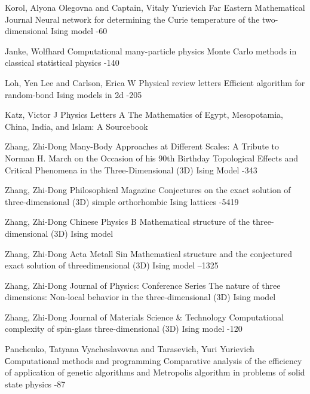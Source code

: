 \documentclass[10pt]{article}
\begin{document}
\begin{thebibliography}{20}
		\by Korol, Alyona Olegovna and Captain, Vitaly Yurievich
		\jour Far Eastern Mathematical Journal
		\paper Neural network for determining the Curie temperature of the two-dimensional Ising model
		-60
		
		\by Janke, Wolfhard
		\jour Computational many-particle physics
		\paper Monte Carlo methods in classical statistical physics
		-140
		
		\by Loh, Yen Lee and Carlson, Erica W
		\jour Physical review letters
		\paper Efficient algorithm for random-bond Ising models in 2d
		-205
		
		\by Katz, Victor J
		\jour Physics Letters A
		\paper The Mathematics of Egypt, Mesopotamia, China, India, and Islam: A Sourcebook
		
		\by Zhang, Zhi-Dong
		\jour Many-Body Approaches at Different Scales: A Tribute to Norman H. March on the Occasion of his 90th Birthday
		\paper Topological Effects and Critical Phenomena in the Three-Dimensional (3D) Ising Model
		-343
		
		\by Zhang, Zhi-Dong
		\jour Philosophical Magazine
		\paper Conjectures on the exact solution of three-dimensional (3D) simple orthorhombic Ising lattices
		-5419
		
		\by Zhang, Zhi-Dong
		\jour Chinese Physics B
		\paper Mathematical structure of the three-dimensional (3D) Ising model
		
		\by Zhang, Zhi-Dong
		\jour Acta Metall Sin
		\paper Mathematical structure and the conjectured exact solution of threedimensional (3D) Ising model
		--1325
		
		\by Zhang, Zhi-Dong
		\jour Journal of Physics: Conference Series
		\paper The nature of three dimensions: Non-local behavior in the three-dimensional (3D) Ising model
		
		\by Zhang, Zhi-Dong
		\jour Journal of Materials Science \& Technology
		\paper Computational complexity of spin-glass three-dimensional (3D) Ising model
		-120
		
		\by Panchenko, Tatyana Vyacheslavovna and Tarasevich, Yuri Yurievich
		\jour Сomputational methods and programming
		\paper Comparative analysis of the efficiency of application of genetic algorithms and Metropolis algorithm in problems of solid state physics
		-87
		
	\end{thebibliography}
	
	
	
	\EndArticle
\end{document}
